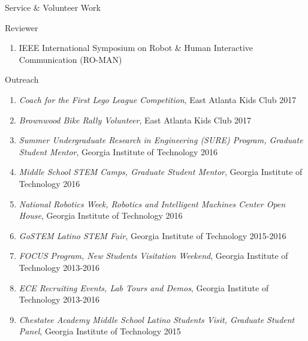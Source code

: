 \documentclass{resume} %
\newcommand{\sectionspace}{\vspace{3mm}}
\newcommand{\simplelistentry}[3]{\textit{#1}, {#2} \hfill {#3}}
\begin{document}
\sectionspace

\begin{rSection}{Service \& Volunteer Work}

\begin{rSubsection}{Reviewer}{}{}{}
\item
\begin{enumerate}
\item IEEE International Symposium on Robot \& Human Interactive Communication (RO-MAN)
\end{enumerate}
\end{rSubsection}



\begin{rSubsection}{Outreach}{}{}{}
\item
\begin{enumerate}

\item \simplelistentry{Coach for the First Lego League Competition}{East Atlanta
    Kids Club}{2017}

\item \simplelistentry{Brownwood Bike Rally Volunteer}{East Atlanta Kids
    Club}{2017}

\item \simplelistentry{Summer Undergraduate Research in Engineering (SURE)
    Program, Graduate Student Mentor}{Georgia Institute of Technology}{2016}

\item \simplelistentry{Middle School STEM Camps, Graduate Student
    Mentor}{Georgia Institute of Technology}{2016}

\item \simplelistentry{National Robotics Week, Robotics and Intelligent Machines
    Center Open House}{Georgia Institute of Technology}{2016}

\item \simplelistentry{GoSTEM Latino STEM Fair}{Georgia Institute of
    Technology}{2015-2016}

\item \simplelistentry{FOCUS Program, New Students Visitation Weekend}{Georgia
    Institute of Technology}{2013-2016}

\item \simplelistentry{ECE Recruiting Events, Lab Tours and Demos}{Georgia
    Institute of Technology}{2013-2016}

\item \simplelistentry{Chestatee Academy Middle School Latino Students Visit,
    Graduate Student Panel}{Georgia Institute of Technology}{2015}


\end{enumerate}
\end{rSubsection}
\end{rSection}
\end{document}

